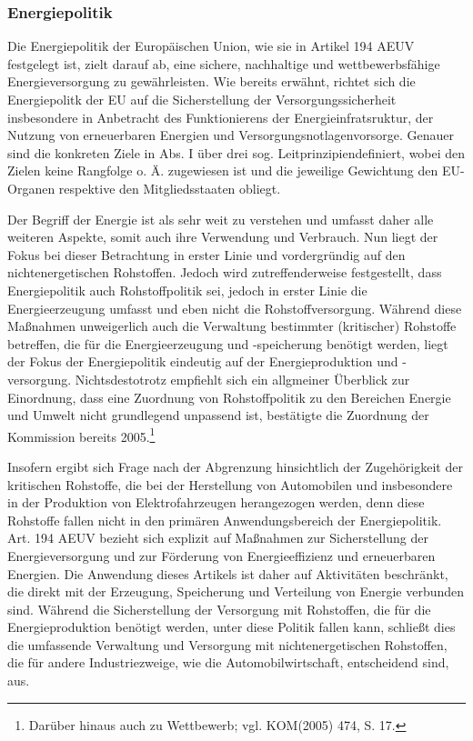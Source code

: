 \documentclass[12pt,a4paper,oneside]{book} %
\begin{document}
	
	
\subsubsection{Energiepolitik}
Die Energiepolitik der Europäischen Union, wie sie in Artikel 194 AEUV festgelegt ist, zielt darauf ab, eine sichere, nachhaltige und wettbewerbsfähige Energieversorgung zu gewährleisten. Wie bereits erwähnt, richtet sich die Energiepolitk der EU auf die Sicherstellung der Versorgungssicherheit insbesondere in Anbetracht des Funktionierens der Energieinfratsruktur, der Nutzung von erneuerbaren Energien und Versorgungsnotlagenvorsorge.\autocite[387]{frau_rohstoffe_2025} Genauer sind die konkreten Ziele in Abs. I über drei sog. \glqq Leitprinzipien\grqq definiert, wobei den Zielen keine Rangfolge o. Ä. zugewiesen ist und die jeweilige Gewichtung den EU-Organen respektive den Mitgliedsstaaten obliegt.\autocite[Gundel § M Rn. 26 27]{dauses_handbuch_2024} 

Der Begriff der Energie ist als sehr weit zu verstehen und umfasst daher alle weiteren Aspekte, somit auch ihre Verwendung und Verbrauch.\autocite[Hamer Art. 194 Rn 8]{von_der_groeben_europaisches_2024} Nun liegt der Fokus bei dieser Betrachtung in erster Linie und vordergründig auf den nichtenergetischen Rohstoffen.
Jedoch wird  zutreffenderweise festgestellt, dass Energiepolitik auch Rohstoffpolitik sei, jedoch in erster Linie die Energieerzeugung umfasst und eben nicht die  Rohstoffversorgung. Während diese Maßnahmen unweigerlich auch die Verwaltung bestimmter (kritischer) Rohstoffe betreffen, die für die Energieerzeugung und -speicherung benötigt werden, liegt der Fokus der Energiepolitik eindeutig auf der Energieproduktion und -versorgung. Nichtsdestotrotz empfiehlt sich ein allgmeiner Überblick zur Einordnung, dass eine Zuordnung von Rohstoffpolitik zu den Bereichen Energie und Umwelt nicht grundlegend unpassend ist, bestätigte die Zuordnung der Kommission bereits 2005.\footnote{Darüber hinaus auch zu Wettbewerb; vgl. KOM(2005) 474, S. 17.}

Insofern ergibt sich Frage nach der Abgrenzung hinsichtlich der Zugehörigkeit der kritischen Rohstoffe, die bei der Herstellung von Automobilen und insbesondere in der Produktion von Elektrofahrzeugen herangezogen werden, denn diese Rohstoffe fallen nicht in den primären Anwendungsbereich der Energiepolitik. Art. 194 AEUV bezieht sich explizit auf Maßnahmen zur Sicherstellung der Energieversorgung und zur Förderung von Energieeffizienz und erneuerbaren Energien. Die Anwendung dieses Artikels ist daher auf Aktivitäten beschränkt, die direkt mit der Erzeugung, Speicherung und Verteilung von Energie verbunden sind. Während die Sicherstellung der Versorgung mit Rohstoffen, die für die Energieproduktion benötigt werden, unter diese Politik fallen kann, schließt dies die umfassende Verwaltung und Versorgung mit nichtenergetischen Rohstoffen, die für andere Industriezweige, wie die Automobilwirtschaft, entscheidend sind, aus.
	
\end{document}

